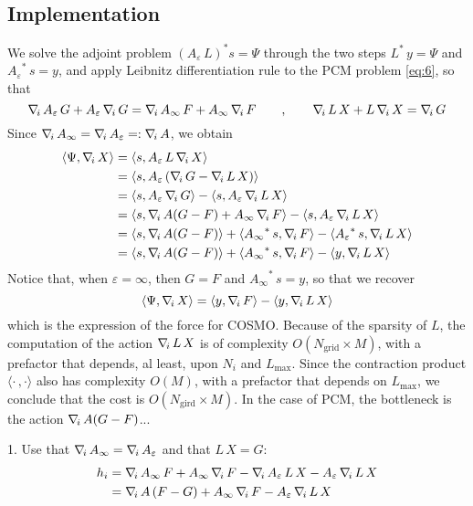 \subsection{Implementation}
We solve the adjoint problem $(A_\varepsilon \, L )^* s = \Psi$ through the two steps ${L}^* \, y = \Psi$ and ${A_\varepsilon}^* \, s = y$, and apply Leibnitz differentiation rule to the PCM problem \eqref{eq:6}, so that
\[
\nabla_{\!i}\, A_\varepsilon \, G + A_\varepsilon \, \nabla_{\!i}\, G = \nabla_{\!i}\, A_\infty \, F + A_\infty \, \nabla_{\!i}\, F  \qquad , \qquad \nabla_{\!i}\, L \, X + L \, \nabla_{\!i}\, X = \nabla_{\!i}\, G
\]
Since $\nabla_{\!i}\, A_\infty=\nabla_{\!i}\, A_\varepsilon =: \nabla_{\!i}\, A$, we obtain
\begin{align*}
\langle \Psi , \nablai X\rangle &  = \langle s ,  A_\varepsilon \, L \, \nablai X\rangle \\
&  = \langle s ,  A_\varepsilon \,( \nablai G - \nablai L \,  X ) \rangle \\ 
& = \langle s ,  A_\varepsilon \, \nablai G \rangle - \langle s , A_\varepsilon \, \nablai L \,  X \rangle \\
& = \langle s , \nablai  A ( G - F) + A_\infty \, \nablai F \rangle - \langle s , A_\varepsilon \, \nablai L \,  X \rangle \\
& = \langle s , \nablai  A ( G - F) \rangle + \langle {A_\infty}^* \, s , \nablai F \rangle - \langle {A_\varepsilon}^* \, s , \nablai L \,  X \rangle \\
& = \langle s , \nablai  A ( G - F) \rangle + \langle {A_\infty}^* \, s , \nablai F \rangle - \langle y , \nablai L \,  X \rangle
\end{align*}
Notice that, when $\varepsilon = \infty$, then $G = F$ and ${A_\infty}^* \, s =y$, so that we recover
\[
\langle \Psi , \nabla_{\!i}\, X\rangle =  \langle y , \nabla_{\!i}\, F \rangle - \langle y , \nabla_{\!i}\, L \,  X \rangle
\]
which is the expression of the force for COSMO. Because of the sparsity of $L$, the computation of the action $\nabla_{\!i}\, L \, X$ is of complexity $O(N_\text{grid} \times M)$, with a prefactor that depends, al least, upon $N_i$ and $L_\text{max}$. Since the contraction product $\langle \cdot \, , \cdot \rangle$ also has complexity $O(M)$, with a prefactor that depends on $L_\text{max}$, we conclude that the cost is $O(N_\text{gird} \times M)$. In the case of PCM, the bottleneck is the action $ \nabla_{\!i}\,  A ( G - F)$...

1. Use that $\nabla_{\!i}\, A_\infty=\nabla_{\!i}\, A_\varepsilon$ and that $L \, X=G$:
\begin{alignat*}{1}
h_i &= \nabla_{\!i}\, A_\infty \, F +  A_\infty \, \nabla_{\!i}\, F - \nabla_{\!i}\, A_\varepsilon \, L \, X -  A_\varepsilon \, \nabla_{\!i}\, L \, X\\
&= \nabla_{\!i}\, A \, (F-  G) +  A_\infty \, \nabla_{\!i}\, F  -  A_\varepsilon \, \nabla_{\!i}\, L \, X
\end{alignat*}

